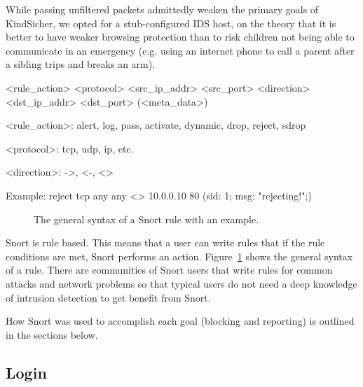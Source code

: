 While passing unfiltered packets admittedly weaken the primary goals of
KindSicher, we opted for a stub-configured IDS host, on the theory that it is
better to have weaker browsing protection than to risk children not being able
to communicate in an emergency (e.g. using an internet phone to call a parent
after a sibling trips and breaks an arm).



\newcommand*\ifline[3]{%
        \ifthenelse{\value{VerbboxLineNo} = #1}{#2}{#3}}

\begin{verbbox}[\ifline{6}{\vspace{10pt}}{\ifline{10}{\vspace{3pt}}{\ifline{12}{\vspace{3pt}}{\ifline{14}{\vspace{10pt}}{}}}}]
<rule_action> <protocol>
    <src_ip_addr> <src_port>
    <direction>
    <dst_ip_addr> <dst_port>
    (<meta_data>)


<rule_action>: alert, log, pass, activate,
    dynamic, drop, reject, sdrop

<protocol>: tcp, udp, ip, etc.

<direction>: ->, <-, <>

Example:
reject tcp
    any any
    <>
    10.0.0.10 80
    (sid: 1; msg: "rejecting!";)

\end{verbbox}

\begin{figure}[!t]
    \centering
    \theverbbox
    \caption{The general syntax of a Snort rule with an example.}
    \label{fig:rule_syntax}
\end{figure}

Snort is rule based. This means that a user can write rules that if the rule
conditions are met, Snort performs an action. Figure~\ref{fig:rule_syntax}
shows the general syntax of a rule. There are communities of Snort users that
write rules for common attacks and network problems so that typical users do
not need a deep knowledge of intrusion detection to get benefit from Snort.


How Snort was used to accomplish each goal (blocking and reporting) is outlined
in the sections below.

\subsection{Login}


